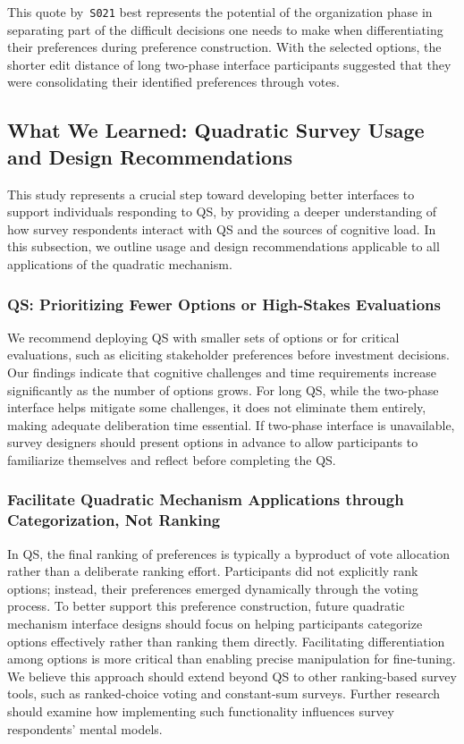 This quote by~\texttt{S021} best represents the potential of the organization phase in separating part of the difficult decisions one needs to make when differentiating their preferences during preference construction. With the selected options, the shorter edit distance of long two-phase interface participants suggested that they were consolidating their identified preferences through votes.



\subsection{What We Learned: Quadratic Survey Usage and Design Recommendations}
This study represents a crucial step toward developing better interfaces to support individuals responding to QS, by providing a deeper understanding of how survey respondents interact with QS and the sources of cognitive load. In this subsection, we outline usage and design recommendations applicable to all applications of the quadratic mechanism.

\subsubsection{QS: Prioritizing Fewer Options or High-Stakes Evaluations}
We recommend deploying QS with smaller sets of options or for critical evaluations, such as eliciting stakeholder preferences before investment decisions. Our findings indicate that cognitive challenges and time requirements increase significantly as the number of options grows. For long QS, while the two-phase interface helps mitigate some challenges, it does not eliminate them entirely, making adequate deliberation time essential. If two-phase interface is unavailable, survey designers should present options in advance to allow participants to familiarize themselves and reflect before completing the QS.

\subsubsection{Facilitate Quadratic Mechanism Applications through Categorization, Not Ranking}
In QS, the final ranking of preferences is typically a byproduct of vote allocation rather than a deliberate ranking effort. Participants did not explicitly rank options; instead, their preferences emerged dynamically through the voting process. To better support this preference construction, future quadratic mechanism interface designs should focus on helping participants categorize options effectively rather than ranking them directly. Facilitating differentiation among options is more critical than enabling precise manipulation for fine-tuning. We believe this approach should extend beyond QS to other ranking-based survey tools, such as ranked-choice voting and constant-sum surveys. Further research should examine how implementing such functionality influences survey respondents' mental models.

